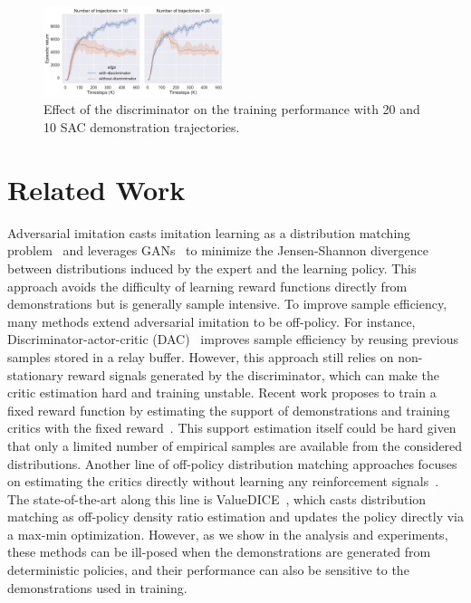 \documentclass[letterpaper]{article} %
\begin{document}
\begin{figure}
\centering
\includegraphics[width=0.81\linewidth,height=1.03in ]{ablation.pdf}
\caption{Effect of the discriminator on the training performance with 20 and 10 SAC demonstration trajectories.}
\label{fig:ablation-discriminator}
\end{figure}


\vspace{-0.94mm}
\section{Related Work}
Adversarial imitation casts imitation learning as a distribution matching problem~\cite{ho2016generative} and leverages GANs~\cite{goodfellow2014generative} to minimize the Jensen-Shannon divergence between distributions induced by the expert and the learning policy.
This approach avoids the difficulty of learning reward functions directly from demonstrations but is generally sample intensive.
To improve sample efficiency, many methods extend adversarial imitation to be off-policy.
For instance, Discriminator-actor-critic (DAC)~\cite{kostrikov2018discriminator,sasaki2018sample} improves sample efficiency by reusing previous samples stored in a relay buffer.
However, this approach still relies on non-stationary reward signals generated by the discriminator, which can make the critic estimation hard and training unstable.
Recent work proposes to train a fixed reward function by estimating the support of demonstrations and training  critics with the fixed reward~\cite{wang2019random}.
This support estimation itself could be hard given that only a limited number of empirical samples are available from the considered distributions.
Another line of off-policy distribution matching approaches focuses on estimating the critics directly without learning any reinforcement signals~\cite{sasaki2018sample,kostrikov2019imitation}.
The state-of-the-art along this line is  ValueDICE~\cite{kostrikov2019imitation}, which casts distribution matching as off-policy density ratio estimation and updates the policy directly via a max-min optimization.
However, as we show in the analysis and experiments, these methods can be ill-posed when the demonstrations are generated from deterministic policies, and their performance can also be sensitive to the demonstrations used in training.
\end{document}
